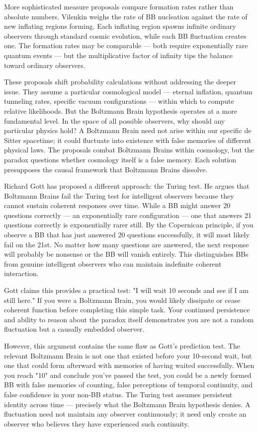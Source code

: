 More sophisticated measure proposals compare formation rates rather than absolute numbers. Vilenkin weighs the rate of BB nucleation against the rate of new inflating regions forming. Each inflating region spawns infinite ordinary observers through standard cosmic evolution, while each BB fluctuation creates one. The formation rates may be comparable — both require exponentially rare quantum events — but the multiplicative factor of infinity tips the balance toward ordinary observers.

These proposals shift probability calculations without addressing the deeper issue. They assume a particular cosmological model — eternal inflation, quantum tunneling rates, specific vacuum configurations — within which to compute relative likelihoods. But the Boltzmann Brain hypothesis operates at a more fundamental level. In the space of all possible observers, why should any particular physics hold? A Boltzmann Brain need not arise within our specific de Sitter spacetime; it could fluctuate into existence with false memories of different physical laws. The proposals combat Boltzmann Brains within cosmology, but the paradox questions whether cosmology itself is a false memory. Each solution presupposes the causal framework that Boltzmann Brains dissolve.

Richard Gott has proposed a different approach: the Turing test. He argues that Boltzmann Brains fail the Turing test for intelligent observers because they cannot sustain coherent responses over time. While a BB might answer 20 questions correctly — an exponentially rare configuration — one that answers 21 questions correctly is exponentially rarer still. By the Copernican principle, if you observe a BB that has just answered 20 questions successfully, it will most likely fail on the 21st. No matter how many questions are answered, the next response will probably be nonsense or the BB will vanish entirely. This distinguishes BBs from genuine intelligent observers who can maintain indefinite coherent interaction.

Gott claims this provides a practical test: "I will wait 10 seconds and see if I am still here." If you were a Boltzmann Brain, you would likely dissipate or cease coherent function before completing this simple task. Your continued persistence and ability to reason about the paradox itself demonstrates you are not a random fluctuation but a causally embedded observer.

However, this argument contains the same flaw as Gott's prediction test. The relevant Boltzmann Brain is not one that existed before your 10-second wait, but one that could form afterward with memories of having waited successfully. When you reach "10" and conclude you've passed the test, you could be a newly formed BB with false memories of counting, false perceptions of temporal continuity, and false confidence in your non-BB status. The Turing test assumes persistent identity across time — precisely what the Boltzmann Brain hypothesis denies. A fluctuation need not maintain any observer continuously; it need only create an observer who believes they have experienced such continuity.

